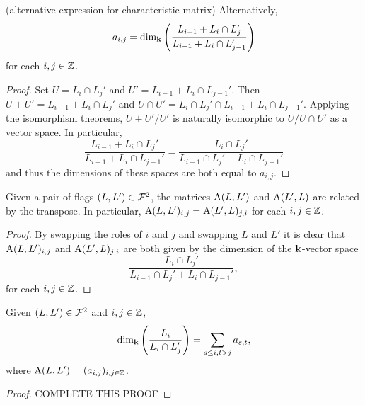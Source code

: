 \documentclass[a4paper, 11pt]{report}
\begin{document}
\begin{lemma}(alternative expression for characteristic matrix)
Alternatively,
\begin{equation*}
a_{i,j} = \dim_{\mathbf{k}}\left(\frac{L_{i-1} + L_i\cap L_j'}{L_{i-1} + L_i\cap L_{j-1}'}\right)
\end{equation*}
for each $i,j\in\mathbb{Z}$.
\end{lemma}
\begin{proof}
Set $U=L_i\cap L_j'$ and $U'=L_{i-1}+L_i\cap L_{j-1}'$. Then $U+U'=L_{i-1}+L_i\cap L_j'$ and $U\cap U'= L_i\cap L_j'\cap L_{i-1} + L_i\cap L_{j-1}'$. Applying the isomorphism theorems, ${U+U'}/{U'}$ is naturally isomorphic to $U/{U\cap U'}$ as a vector space. In particular,
\begin{equation*}
\frac{L_{i-1}+L_i\cap L_j'}{L_{i-1} + L_i\cap L_{j-1}'} = \frac{L_i\cap L_j'}{L_{i-1}\cap L_j' + L_i\cap L_{j-1}'}
\end{equation*}
and thus the dimensions of these spaces are both equal to $a_{i,j}$.
\end{proof}

\begin{lemma}
Given a pair of flags $(L,L')\in\mathcal{F}^2$, the matrices $\operatorname{A}(L,L')$ and $\operatorname{A}(L',L)$ are related by the transpose. In particular, $\operatorname{A}(L,L')_{i,j} = \operatorname{A}(L',L)_{j,i}$ for each $i,j\in\mathbb{Z}$.
\end{lemma}
\begin{proof}
By swapping the roles of $i$ and $j$ and swapping $L$ and $L'$ it is clear that $\operatorname{A}(L,L')_{i,j}$ and $\operatorname{A}(L',L)_{j,i}$ are both given by the dimension of the $\mathbf{k}$-vector space
\begin{equation*}
\frac{L_i\cap L_j'}{L_{i-1}\cap L_j' + L_i\cap L_{j-1}'},
\end{equation*}
for each $i,j\in\mathbb{Z}$.
\end{proof}

\begin{lemma}\label{lemma:flags-codimension-formula}
Given $(L,L')\in\mathcal{F}^2$ and $i,j\in\mathbb{Z}$,
\begin{equation*}
\dim_{\mathbf{k}}\left(\frac{L_i}{L_i\cap L_j'}\right) = \sum_{s\le i, t>j} a_{s,t},
\end{equation*}
where $\operatorname{A}(L,L')=(a_{i,j})_{i,j\in\mathbb{Z}}$.
\end{lemma}
\begin{proof}
{\color{red}COMPLETE THIS PROOF}	
\end{proof}
\end{document}
